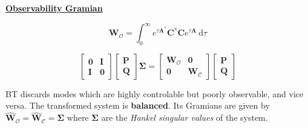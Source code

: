 \documentclass[aspectratio=169, usenames, dvipsnames]{beamer}
\begin{document}
\begin{frame}
  \vfill
  \centering

  \underline{\textbf{Observability Gramian}}

  \Large
  {
    \[
    \bm{W}_{\mathcal{O}} = \displaystyle \int_0^{\infty} e^{\tau \bm{A}^*} \bm{C}^* \bm{C} e^{\tau \bm{A}} \ \mathrm{d}\tau
    \]
  }

  \vfill
\end{frame}


\begin{frame}
  \vfill

  \begin{tcolorbox}[
    enhanced,
    coltitle=black,
    coltext=white,
    colback=black,
    title=\textbf{Balancing transform / Balanced tuncation},
    frame style tile={width=\paperwidth}{background.jpg}
    ]

    \medskip
    \Large

    \[
    \begin{bmatrix}
      \bm{0} & \bm{I} \\
      \bm{I} & \bm{0}
    \end{bmatrix}
    \begin{bmatrix}
      \bm{P} \\ \bm{Q}
    \end{bmatrix}
    \boldsymbol{\Sigma}
      =
    \begin{bmatrix}
      \bm{W}_{\mathcal{O}} & \bm{0} \\
      \bm{0} & \bm{W}_{\mathcal{C}}
    \end{bmatrix}
    \begin{bmatrix}
      \bm{P} \\ \bm{Q}
    \end{bmatrix}
    \]

    \medskip
  \end{tcolorbox}

  \vfill

  BT discards modes which are highly controlable but poorly observable, and vice versa.
  The transformed system is \textbf{balanced}.
  Its Gramians are given by $\hat{\bm{W}}_{\mathcal{O}} = \hat{\bm{W}}_{\mathcal{C}} = \boldsymbol{\Sigma}$ where $\boldsymbol{\Sigma}$ are the \emph{Hankel singular values} of the system.

  \vfill
\end{frame}
\end{document}
